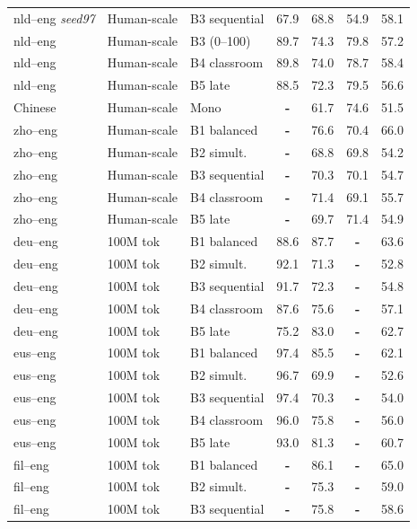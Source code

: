 \begin{table}[t]
\begin{tabular}{lll cc cc}
nld--eng {\scriptsize\textit{seed97}} & Human-scale & B3 sequential & 67.9 & 68.8 & 54.9 & 58.1 \\
nld--eng & Human-scale & B3 (0--100) & 89.7 & 74.3 & 79.8 & 57.2 \\
nld--eng & Human-scale & B4 classroom & 89.8 & 74.0 & 78.7 & 58.4 \\
nld--eng & Human-scale & B5 late & 88.5 & 72.3 & 79.5 & 56.6 \\
Chinese & Human-scale & Mono & \textbf{-} & 61.7 & 74.6 & 51.5 \\
zho--eng & Human-scale & B1 balanced & \textbf{-} & 76.6 & 70.4 & 66.0 \\
zho--eng & Human-scale & B2 simult. & \textbf{-} & 68.8 & 69.8 & 54.2 \\
zho--eng & Human-scale & B3 sequential & \textbf{-} & 70.3 & 70.1 & 54.7 \\
zho--eng & Human-scale & B4 classroom & \textbf{-} & 71.4 & 69.1 & 55.7 \\
zho--eng & Human-scale & B5 late & \textbf{-} & 69.7 & 71.4 & 54.9 \\
\midrule
deu--eng & 100M tok & B1 balanced & 88.6 & 87.7 & \textbf{-} & 63.6 \\
deu--eng & 100M tok & B2 simult. & 92.1 & 71.3 & \textbf{-} & 52.8 \\
deu--eng & 100M tok & B3 sequential & 91.7 & 72.3 & \textbf{-} & 54.8 \\
deu--eng  & 100M tok & B4 classroom & 87.6 & 75.6 & \textbf{-} & 57.1 \\
deu--eng  & 100M tok & B5 late & 75.2 & 83.0 & \textbf{-} & 62.7 \\
eus--eng & 100M tok & B1 balanced & 97.4 & 85.5 & \textbf{-} & 62.1 \\
eus--eng & 100M tok & B2 simult. & 96.7 & 69.9 & \textbf{-} & 52.6 \\
eus--eng & 100M tok & B3 sequential & 97.4 & 70.3 & \textbf{-} & 54.0 \\
eus--eng  & 100M tok & B4 classroom & 96.0 & 75.8 & \textbf{-} & 56.0 \\
eus--eng  & 100M tok & B5 late & 93.0 & 81.3 & \textbf{-} & 60.7 \\
fil--eng & 100M tok & B1 balanced & \textbf{-} & 86.1 & \textbf{-} & 65.0 \\
fil--eng & 100M tok & B2 simult. & \textbf{-} & 75.3 & \textbf{-} & 59.0 \\
fil--eng & 100M tok & B3 sequential & \textbf{-} & 75.8 & \textbf{-} & 58.6 \\

\end{tabular}
\end{table}
